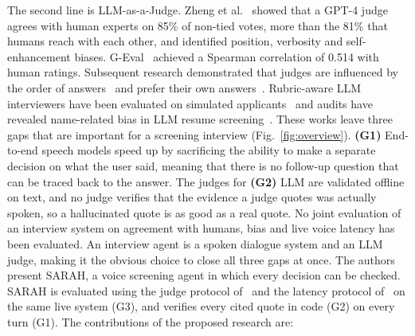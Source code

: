 \documentclass[conference]{IEEEtran}
\begin{document}
The second line is LLM-as-a-Judge. Zheng et al.~\cite{zheng2023} showed that a GPT-4 judge agrees with human experts on 85\% of non-tied votes, more than the 81\% that humans reach with each other, and identified position, verbosity and self-enhancement biases. G-Eval~\cite{geval} achieved a Spearman correlation of 0.514 with human ratings. Subsequent research demonstrated that judges are influenced by the order of answers~\cite{wang2023fair} and prefer their own answers~\cite{panickssery2024}. Rubric-aware LLM interviewers have been evaluated on simulated applicants~\cite{stuart2026} and audits have revealed name-related bias in LLM resume screening~\cite{armstrong2024}. These works leave three gaps that are important for a screening interview (Fig.~\ref{fig:overview}). \textbf{(G1)} End-to-end speech models speed up by sacrificing the ability to make a separate decision on what the user said, meaning that there is no follow-up question that can be traced back to the answer. The judges for \textbf{(G2)} LLM are validated offline on text, and no judge verifies that the evidence a judge quotes was actually spoken, so a hallucinated quote is as good as a real quote. No joint evaluation of an interview system on agreement with humans, bias and live voice latency has been evaluated. An interview agent is a spoken dialogue system and an LLM judge, making it the obvious choice to close all three gaps at once. The authors present SARAH, a voice screening agent in which every decision can be checked. SARAH is evaluated using the judge protocol of~\cite{zheng2023} and the latency protocol of~\cite{freezeomni} on the same live system (G3), and verifies every cited quote in code (G2) on every turn (G1). The contributions of the proposed research are:
\end{document}
